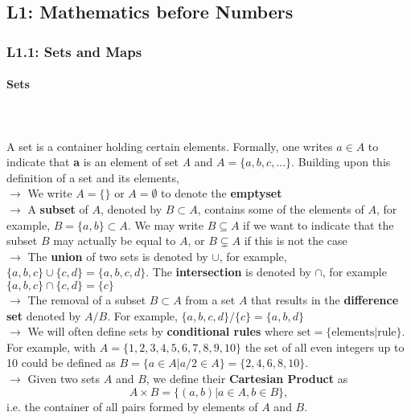 \documentclass[11pt, oneside]{article}   	%
\begin{document}
\subsection{L1: Mathematics before Numbers} 
\subsubsection{L1.1: Sets and Maps} 
\paragraph{Sets} \mbox{} \\ \\
 A set is a container holding certain elements. Formally, one writes $a \in A$ to indicate that \textbf{a} is an element of set \textit{A} and $A = \{a, b, c, ... \}$. Building upon this definition of a set and its elements, \\

$\rightarrow$ We write $A = \{\}$ or $A = \emptyset$ to denote the \textbf{emptyset} \\

$\rightarrow$ A \textbf{subset} of $A$, denoted by $B\subset A$, contains some of the elements of $A$, for example, $B = \{a, b\} \subset A$. We may write $B \subseteq A$ if we want to indicate that the subset $B$ may actually be equal to $A$, or $B \subsetneq A$ if this is not the case \\

$\rightarrow$ The \textbf{union} of two sets is denoted by $\cup$, for example, $\{a, b, c\} \cup \{c, d\} = \{a, b, c, d\}$. The \textbf{intersection} is denoted by $\cap$, for example $\{a, b, c\} \cap \{c, d\} = \{c\}$ \\

$\rightarrow$ The removal of a subset $B \subset A$ from a set $A$ that results in the \textbf{difference set} denoted by $A/B$. For example, $\{a, b, c, d\} / \{c\} = \{a, b, d\}$ \\ 

$\rightarrow$ We will often define sets by \textbf{conditional rules} where $\text{set} = \{ \text{elements} | \text{rule} \}$. For example, with $A = \{1,2,3,4,5,6,7,8,9,10\}$ the set of all even integers up to 10 could be defined as $B = \{a \in A | a/2 \in A\} = \{2,4,6,8,10\}$. \\

$\rightarrow$ Given two sets $A$ and $B$, we define their \textbf{Cartesian Product} as 
\[ A \times B = \{(a,b) | a \in A, b \in B\}, \]
i.e. the container of all pairs formed by elements of $A$ and $B$. 
\end{document}
